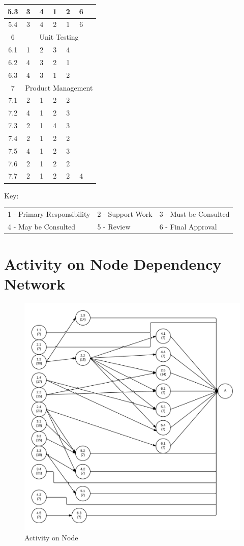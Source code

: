 \begin{longtable}{|c|c|c|c|c|c|c|}
	5.3  &3&4&1&2&6\\ \hline
	5.4  &3&4&2&1&6\\ \hline
	\hline 6 & \multicolumn{6}{c|}{Unit Testing} \\ \hline
	6.1  &1&2&3&4& \\ \hline
	6.2  &4&3&2&1& \\ \hline
	6.3  &4&3&1&2& \\ \hline
	\hline 7 & \multicolumn{6}{c|}{Product Management} \\ \hline
	7.1 &2&1&2&2&  \\ \hline
	7.2  &4&1&2&3&  \\ \hline
	7.3  &2&1&4&3&  \\ \hline
	7.4  &2&1&2&2&  \\ \hline
	7.5 &4&1&2&3&  \\ \hline
	7.6 &2&1&2&2&\\ \hline
	7.7 &2&1&2&2&4\\ \hline
\end{longtable}
Key:
\begin{tabular}{l l l}
	1 - Primary Responsibility & 2 - Support Work & 3 - Must be Consulted \\
	4 - May be Consulted & 5 - Review & 6 - Final Approval \\
\end{tabular}
\section{Activity on Node Dependency Network}
\begin{figure}[H]
\centering
\includegraphics[width=1\textwidth]{AON.jpeg}
\caption{Activity on Node}
\label{fig:Activity on Node}
\end{figure}
